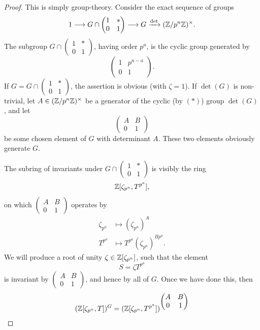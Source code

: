 \begin{proof}
This is simply group-theory. Consider the exact sequence of groups
\[
1 \longrightarrow G \cap \begin{pmatrix} 1 & * \\ 0 & 1 \end{pmatrix} \longrightarrow G \xrightarrow{\det} (\mathbb{Z}/p^n\mathbb{Z})^\times .
\]
The subgroup $G \cap \begin{pmatrix} 1 & * \\ 0 & 1 \end{pmatrix}$, having order $p^a$, is the cyclic group generated by
\[
\begin{pmatrix} 1 & p^{n-a} \\ 0 & 1 \end{pmatrix} .
\]
If $G = G \cap \begin{pmatrix} 1 & * \\ 0 & 1 \end{pmatrix}$, the assertion is obvious (with $\zeta = 1$). If $\det(G)$ is non-trivial, let $A \in (\mathbb{Z}/p^n\mathbb{Z})^\times$ be a generator of the cyclic (by $(*)$) group $\det(G)$, and let
\[
\begin{pmatrix} A & B \\ 0 & 1 \end{pmatrix}
\]
be some chosen element of $G$ with determinant $A$. These two elements obviously generate $G$.
\par
The subring of invariants under $G \cap \begin{pmatrix} 1 & * \\ 0 & 1 \end{pmatrix}$ is visibly the ring
\[
\mathbb{Z}[\zeta_{p^n}, T^{p^a}] ,
\]
on which $\begin{pmatrix} A & B \\ 0 & 1 \end{pmatrix}$ operates by
\begin{align*}
\zeta_{p^n} &\mapsto (\zeta_{p^n})^A \\
T^{p^a} &\mapsto T^{p^a}(\zeta_{p^n})^{Bp^a} .
\end{align*}
We will produce a root of unity $\zeta \in \mathbb{Z}[\zeta_{p^n}]$, such that the element
\[
S = \zeta T^{p^a}
\]
is invariant by $\begin{pmatrix} A & B \\ 0 & 1 \end{pmatrix}$, and hence by all of $G$. Once we have done this, then
\begin{align*}
(\Z[\zeta_{p^n}, T])^G &= (\Z[\zeta_{p^n}, T^{p^a}])^{\begin{pmatrix} A & B \\ 0 & 1 \end{pmatrix}} \\

\end{align*}
\end{proof}
